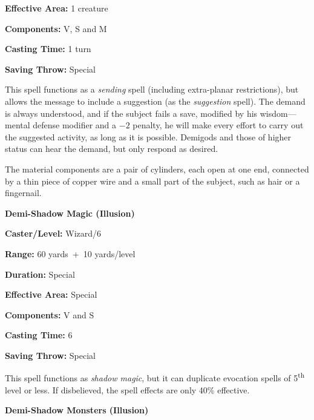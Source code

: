 \begin{multicols}{2}
\begin{minipage}{\columnwidth}
\noindent \textbf{Effective Area:} 1 creature

\noindent \textbf{Components:} V, S and M

\noindent \textbf{Casting Time:} 1 turn

\noindent \textbf{Saving Throw:} Special

\end{minipage}

This spell functions as a \textit{sending} spell (including extra-planar restrictions), but allows the message to include a suggestion (as the \textit{suggestion} spell).  The demand is always understood, and if the subject fails a save, modified by his wisdom---mental defense modifier and a $-2$ penalty, he will make every effort to carry out the suggested activity, as long as it is possible.  Demigods and those of higher status can hear the demand, but only respond as desired.

The material components are a pair of cylinders, each open at one end, connected by a thin piece of copper wire and a small part of the subject, such as hair or a fingernail.

\vspace{1em}

\noindent
\begin{minipage}{\columnwidth}

\noindent \textbf{Demi-Shadow Magic (Illusion)}

\noindent \textbf{Caster/Level:} Wizard/6

\noindent \textbf{Range:} 60 yards~+~10 yards/level

\noindent \textbf{Duration:} Special

\noindent \textbf{Effective Area:} Special

\noindent \textbf{Components:} V and S

\noindent \textbf{Casting Time:} 6

\noindent \textbf{Saving Throw:} Special

\end{minipage}

This spell functions as \textit{shadow magic}, but it can duplicate evocation spells of 5\textsuperscript{th} level or less.  If disbelieved, the spell effects are only 40\% effective.

\vspace{1em}

\noindent
\begin{minipage}{\columnwidth}

\noindent \textbf{Demi-Shadow Monsters (Illusion)}


\end{minipage}
\end{multicols}
